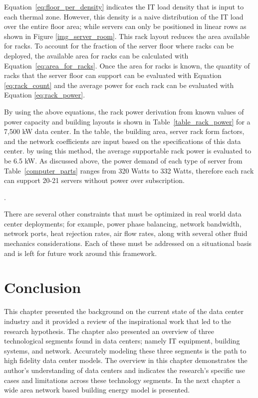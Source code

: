     
    
    Equation~\ref{eq:floor_per_density} indicates the  IT load density that is input to each thermal zone. However, this density is a naive distribution of the IT load over the entire floor area; while servers can only be positioned in linear rows as shown in Figure \ref{img_server_room}. This rack layout reduces the area available for racks. To account for the fraction of the server floor where racks can be deployed, the available area for racks can be calculated with Equation~\ref{eq:area_for_racks}. Once the area for racks is known, the quantity of racks that the server floor can support can be evaluated with Equation \ref{eq:rack_count} and the average power for each rack can be evaluated with Equation \ref{eq:rack_power}.
    
    By using the above equations, the rack power derivation from known values of power capacity and building layouts is shown in Table~\ref{table_rack_power} for a 7,500 kW data center. In the table, the building area, server rack form factors, and the network coefficients are input based on the specifications of this data center. by using this method, the average supportable rack power is evaluated to be 6.5 kW. As discussed above, the power demand of each type of server from Table~\ref{computer_parts} ranges from 320 Watts to 332 Watts, therefore each rack can support 20-21 servers without power over subscription.
    
    .
    
    There are several other constraints that must be optimized in real world data center deployments; for example, power phase balancing, network bandwidth, network ports, heat rejection rates, air flow rates, along with several other fluid mechanics considerations. Each of these must be addressed on a situational basis and is left for future work around this framework.
        
    \section{Conclusion}
    This chapter presented the background on the current state of the data center industry and it provided a review of the inspirational work that led to the research hypothesis. The chapter also presented an overview of three technological segments found in data centers; namely IT equipment, building systems, and network. Accurately modeling these three segments is the path to high fidelity data center models. The overview in this chapter demonstrates the author's understanding of data centers and indicates the research's specific use cases and limitations across these technology segments. In the next chapter a wide area network based building energy model is presented.
    
   
    

    
    
